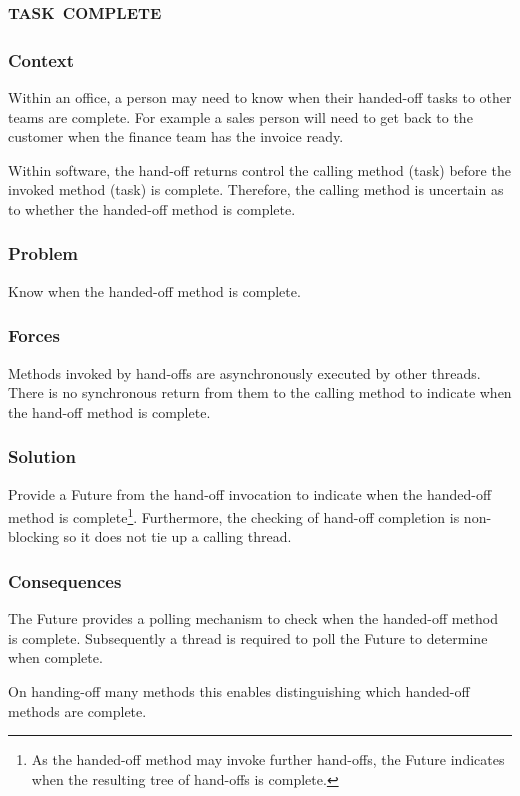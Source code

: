\documentclass[prodmode]{style/acmlarge}
\begin{document}
\subsection{\textsc{\textbf{task complete}}}

\subsubsection*{Context} Within an office, a person may need to know when their
handed-off tasks to other teams are complete.  For example a sales person will
need to get back to the customer when the finance team has the invoice ready.

Within software, the hand-off returns control the calling method (task) before
the invoked method (task) is complete.  Therefore, the calling method is
uncertain as to whether the handed-off method is complete.

\subsubsection*{Problem} Know when the handed-off method is complete.

\subsubsection*{Forces} Methods invoked by hand-offs are asynchronously executed
by other threads.  There is no synchronous return from them to the calling
method to indicate when the hand-off method is complete.

\subsubsection*{Solution} Provide a Future from the hand-off invocation to
indicate when the handed-off method is complete\footnote{As the handed-off
method may invoke further hand-offs, the Future indicates when the resulting
tree of hand-offs is complete.}.  Furthermore, the checking of hand-off
completion is non-blocking so it does not tie up a calling thread.

\subsubsection*{Consequences} The Future provides a polling mechanism to check
when the handed-off method is complete.  Subsequently a thread is required to
poll the Future to determine when complete.

On handing-off many methods this enables distinguishing which handed-off methods
are complete.
\end{document}
